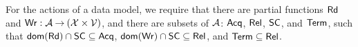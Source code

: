 For the actions of a data model, we require that
there are partial functions $\mathsf{Rd}$ and
$\mathsf{Wr}: \mathcal{A} \mathbin\rightarrow (\mathcal{X} \times \mathcal{V})$, and there are subsets of $\mathcal{A}$:
$\mathsf{Acq}$, $\mathsf{Rel}$, $\mathsf{SC}$, and $\mathsf{Term}$,
such that
$\mathsf{dom}(\mathsf{Rd})\cap\mathsf{SC}\subseteq\mathsf{Acq}$,
$\mathsf{dom}(\mathsf{Wr})\cap\mathsf{SC}\subseteq\mathsf{Rel}$, and
$\mathsf{Term}\subseteq\mathsf{Rel}$.

